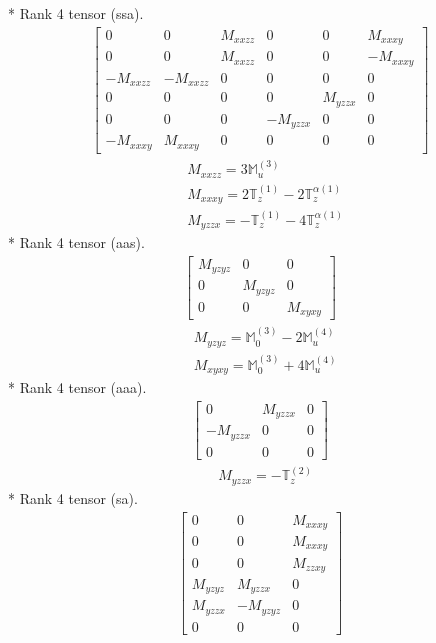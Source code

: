 \documentclass[fleqn,8pt,landscape]{jsarticle}
\begin{document}
* Rank 4 tensor (ssa).
\begin{align*}
\begin{bmatrix} 0 & 0 & M_{xxzz} & 0 & 0 & M_{xxxy} \\ 0 & 0 & M_{xxzz} & 0 & 0 & - M_{xxxy} \\ - M_{xxzz} & - M_{xxzz} & 0 & 0 & 0 & 0 \\ 0 & 0 & 0 & 0 & M_{yzzx} & 0 \\ 0 & 0 & 0 & - M_{yzzx} & 0 & 0 \\ - M_{xxxy} & M_{xxxy} & 0 & 0 & 0 & 0 \end{bmatrix}
\end{align*}
\begin{align*}
& M_{xxzz} = 3 \mathbb{M}_{u}^{(3)} \\
& M_{xxxy} = 2 \mathbb{T}_{z}^{(1)} - 2 \mathbb{T}_{z}^{\alpha(1)} \\
& M_{yzzx} = - \mathbb{T}_{z}^{(1)} - 4 \mathbb{T}_{z}^{\alpha(1)}
\end{align*}
* Rank 4 tensor (aas).
\begin{align*}
\begin{bmatrix} M_{yzyz} & 0 & 0 \\ 0 & M_{yzyz} & 0 \\ 0 & 0 & M_{xyxy} \end{bmatrix}
\end{align*}
\begin{align*}
& M_{yzyz} = \mathbb{M}_{0}^{(3)} - 2 \mathbb{M}_{u}^{(4)} \\
& M_{xyxy} = \mathbb{M}_{0}^{(3)} + 4 \mathbb{M}_{u}^{(4)}
\end{align*}
* Rank 4 tensor (aaa).
\begin{align*}
\begin{bmatrix} 0 & M_{yzzx} & 0 \\ - M_{yzzx} & 0 & 0 \\ 0 & 0 & 0 \end{bmatrix}
\end{align*}
\begin{align*}
& M_{yzzx} = - \mathbb{T}_{z}^{(2)}
\end{align*}
* Rank 4 tensor (sa).
\begin{align*}
\begin{bmatrix} 0 & 0 & M_{xxxy} \\ 0 & 0 & M_{xxxy} \\ 0 & 0 & M_{zzxy} \\ M_{yzyz} & M_{yzzx} & 0 \\ M_{yzzx} & - M_{yzyz} & 0 \\ 0 & 0 & 0 \end{bmatrix}
\end{align*}
\end{document}
